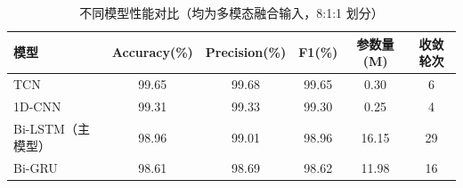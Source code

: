 \begin{table}[htbp]\centering
\caption{不同模型性能对比（均为多模态融合输入，8:1:1 划分）}
\label{tab:model}
\begin{tabular}{lccccc}
\toprule
模型 & Accuracy(\%) & Precision(\%) & F1(\%) & 参数量(M) & 收敛轮次 \\
\midrule
TCN & 99.65 & 99.68 & 99.65 & 0.30 & 6 \\
1D-CNN & 99.31 & 99.33 & 99.30 & 0.25 & 4 \\
Bi-LSTM（主模型） & 98.96 & 99.01 & 98.96 & 16.15 & 29 \\
Bi-GRU & 98.61 & 98.69 & 98.62 & 11.98 & 16 \\
\bottomrule
\end{tabular}
\end{table}
